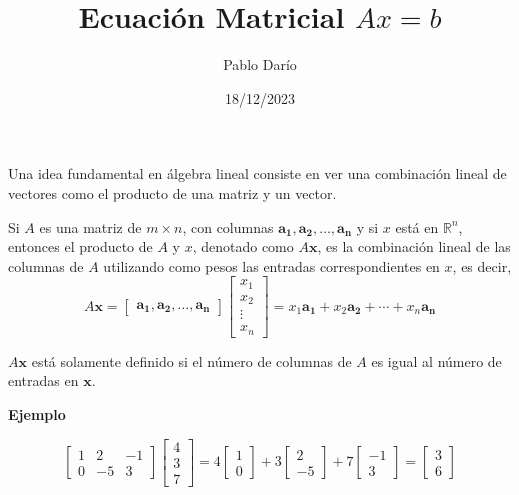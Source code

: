 \documentclass{article}
\title{Ecuación Matricial $Ax = b$}
\author{Pablo Darío}
\date{18/12/2023}
\begin{document}
\maketitle

Una idea fundamental en álgebra lineal consiste en ver una combinación lineal de vectores como el producto de una matriz y un vector. 

\begin{tcolorbox}[colback=blue!10!white,colframe=blue!60!black,title=Producto de una matriz y un vector]
    Si $A$ es una matriz de $m \times n$, con columnas $\mathbf{a_1},\mathbf{a_2},\dots, \mathbf{a_n}$ y si $x$ está en $\mathbb{R}^n$, entonces el producto de $A$ y $x$, denotado como $A\mathbf{x}$, es la combinación lineal de las columnas de $A$ utilizando como pesos las entradas correspondientes en $x$, es decir, $$A\mathbf{x} = \begin{bmatrix}
    \mathbf{a_1},\mathbf{a_2},\dots, \mathbf{a_n} \end{bmatrix} \begin{bmatrix}x_1\\ x_2\\ \vdots \\x_n \end{bmatrix} = x_1\mathbf{a_1} + x_2\mathbf{a_2} + \dotsb + x_n\mathbf{a_n}$$
\end{tcolorbox}

$A\mathbf{x}$ está solamente definido si el número de columnas de $A$ es igual al número de entradas en $\mathbf{x}$.
 
\begin{large}
    \textbf{Ejemplo}
\end{large}

\begin{equation*}
    \begin{bmatrix}
        1 & 2 & -1\\
        0 & -5 & 3
    \end{bmatrix}
    \begin{bmatrix} 4\\3\\7 \end{bmatrix}
    = 4 \begin{bmatrix} 1\\0 \end{bmatrix}
    + 3 \begin{bmatrix} 2\\-5 \end{bmatrix}
    + 7 \begin{bmatrix} -1\\3 \end{bmatrix}
    = \begin{bmatrix} 3\\6 \end{bmatrix} 
\end{equation*}
\end{document}

